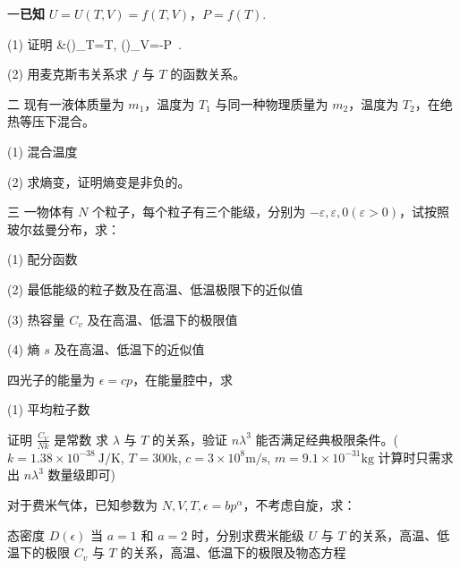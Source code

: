 一\textbf{已知} $U = U(T, V) = f(T, V)$，$P = f(T)$.

(1) 证明
&\left(\right)_T=T, \left(\right)_V=-P~.

(2) 用麦克斯韦关系求 $f$ 与 $T$ 的函数关系。

二
现有一液体质量为 $m_1$，温度为 $T_1$ 与同一种物理质量为 $m_2$，温度为 $T_2$，在绝热等压下混合。

(1) 混合温度

(2) 求熵变，证明熵变是非负的。

三
一物体有 $N$ 个粒子，每个粒子有三个能级，分别为 $-\varepsilon, \varepsilon, 0 (\varepsilon > 0)$，试按照玻尔兹曼分布，求：

(1) 配分函数

(2) 最低能级的粒子数及在高温、低温极限下的近似值

(3) 热容量 $C_v$ 及在高温、低温下的极限值

(4) 熵 $s$ 及在高温、低温下的近似值

四光子的能量为 $\epsilon = cp$，在能量腔中，求

(1) 平均粒子数

证明 $\frac{C_V}{Nk}$ 是常数
求 $\lambda$ 与 $T$ 的关系，验证 $n \lambda^3$ 能否满足经典极限条件。($k=1.38 \times 10^{-38} \ \text{J/K}$, $T=300 \text{k}$, $c=3 \times 10^8 \text{m/s}$, $m=9.1 \times 10^{-31} \text{kg}$ 计算时只需求出 $n \lambda^3$ 数量级即可)



对于费米气体，已知参数为 $N, V, T, \epsilon = b p^\alpha$，不考虑自旋，求：


态密度 $D(\epsilon)$
当 $a=1$ 和 $a=2$ 时，分别求费米能级
$U$ 与 $T$ 的关系，高温、低温下的极限
$C_v$ 与 $T$ 的关系，高温、低温下的极限及物态方程
